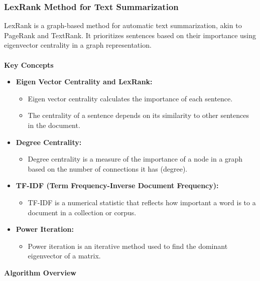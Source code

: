 \documentclass{ieeeaccess}
\begin{document}
\subsubsection{LexRank Method for Text Summarization}
LexRank is a graph-based method for automatic text summarization, akin to PageRank and TextRank. It prioritizes sentences based on their importance using eigenvector centrality in a graph representation.\cite{Lexrank}\\\\
\textbf{Key Concepts}
\begin{itemize}
    \item \textbf{Eigen Vector Centrality and LexRank:}
    \begin{itemize}
        \item Eigen vector centrality calculates the importance of each sentence.
        \item The centrality of a sentence depends on its similarity to other sentences in the document.
    \end{itemize}
    
    \item \textbf{Degree Centrality:}
    \begin{itemize}
        \item Degree centrality is a measure of the importance of a node in a graph based on the number of connections it has (degree).
    \end{itemize}
    
    \item \textbf{TF-IDF (Term Frequency-Inverse Document Frequency):}
    \begin{itemize}
        \item TF-IDF is a numerical statistic that reflects how important a word is to a document in a collection or corpus.
    \end{itemize}
    
    \item \textbf{Power Iteration:}
    \begin{itemize}
        \item Power iteration is an iterative method used to find the dominant eigenvector of a matrix.
    \end{itemize}
\end{itemize}
\textbf{Algorithm Overview}\cite{lexrank2}
\end{document}
